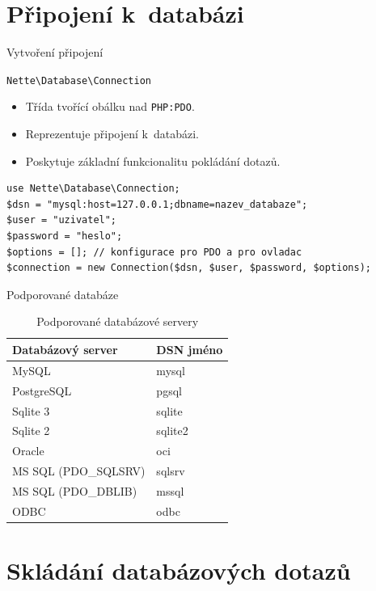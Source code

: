 \documentclass[10pt, hyperref={unicode}]{beamer}
\begin{document}
\section{Připojení k~databázi}

\begin{frame}[fragile]{Vytvoření připojení}
	\begin{alertblock}{\texttt{Nette{\textbackslash}Database{\textbackslash}Connection}}
		\begin{itemize}
			\item Třída tvořící obálku nad \texttt{PHP:PDO}.
			\item Reprezentuje připojení k~databázi.
			\item Poskytuje základní funkcionalitu pokládání dotazů.
		\end{itemize}
	\end{alertblock}

\begin{lstlisting}
use Nette\Database\Connection;
$dsn = "mysql:host=127.0.0.1;dbname=nazev_databaze";
$user = "uzivatel";
$password = "heslo";
$options = []; // konfigurace pro PDO a pro ovladac
$connection = new Connection($dsn, $user, $password, $options);
\end{lstlisting}
\end{frame}



\begin{frame}{Podporované databáze}
	\begin{table}
		\caption{Podporované databázové servery}
		\begin{tabular}{ll}
			\toprule
			Databázový server & DSN jméno\\
			\midrule
			MySQL & mysql\\
			PostgreSQL & pgsql\\
			Sqlite 3 & sqlite\\
			Sqlite 2 & sqlite2\\
			Oracle & oci\\
			MS SQL (PDO\_SQLSRV) & sqlsrv\\
			MS SQL (PDO\_DBLIB) & mssql\\
			ODBC & odbc\\
			\bottomrule
		\end{tabular}
	\end{table}
\end{frame}




\section{Skládání databázových dotazů}
\end{document}
